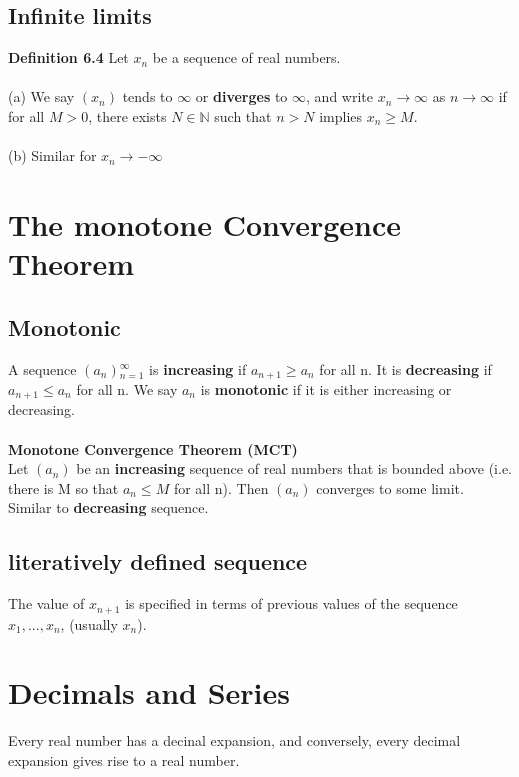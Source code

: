 \documentclass{article}
\begin{document}
\subsection {Infinite limits}
\textbf{Definition 6.4}
Let ${x_{n}}$ be a sequence of real numbers.\\
\\
(a) We say $(x_{n})$ tends to $\infty$ or \textbf{diverges} to $\infty$, and write $x_{n}\rightarrow \infty$ as $n \rightarrow \infty$ if for all $M > 0$, there exists $N \in \mathbb{N}$ such that $n>N$ implies $x_{n}\geq M$.\\
\\
(b) Similar for $x_{n} \rightarrow -\infty$
\pagebreak


\section{The monotone Convergence Theorem}
\subsection{Monotonic}
A sequence $(a_{n}){_{n=1}^{\infty}}$ is \textbf{increasing} if $a_{n+1} \geq a_{n} $ for all n. It is \textbf{decreasing} if $a_{n+1}\leq a_{n}$ for all n. We say ${a_n}$ is \textbf{monotonic} if it is either increasing or decreasing. \\
\\
\textbf{Monotone Convergence Theorem (MCT)}\\
Let $(a_{n})$ be an \textbf{increasing} sequence of real numbers that is bounded above (i.e. there is M so that $a_{n}\leq M$ for all n). Then $(a_{n})$ converges to some limit.\\
Similar to \textbf{decreasing} sequence. \\

\subsection{literatively defined sequence}
The value of $x_{n+1}$ is specified in terms of previous values of the sequence $x_{1}, ..., x_{n}$, (usually $x_{n}$).
\pagebreak


\section{Decimals and Series}
Every real number has a decinal expansion, and conversely, every decimal expansion gives rise to a real number.
\end{document}
